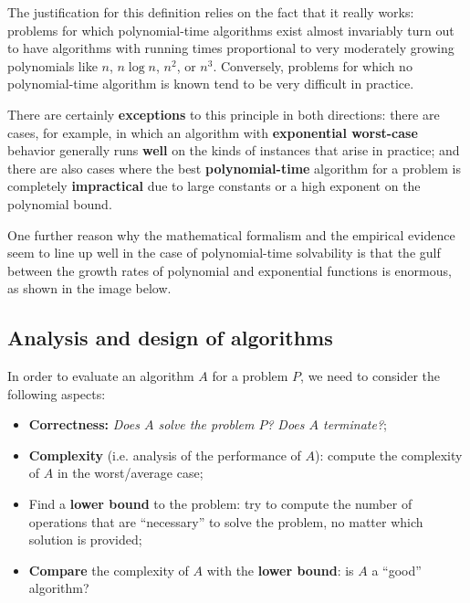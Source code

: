 The justification for this definition relies on the fact that it really works: problems for which polynomial-time algorithms exist almost invariably turn out to have algorithms with running times proportional to very moderately growing polynomials like $n$, $n \log n$, $n^2$, or $n^3$. Conversely, problems for which no polynomial-time algorithm is known tend to be very difficult in practice. 

There are certainly \textbf{exceptions} to this principle in both directions: there are cases, for example, in which an algorithm with \textbf{exponential worst-case} behavior generally runs \textbf{well} on the kinds of instances that arise in practice; and there are also cases where the best \textbf{polynomial-time} algorithm for a problem is completely \textbf{impractical} due to large constants or a high exponent on the polynomial bound. 

One further reason why the mathematical formalism and the empirical evidence seem to line up well in the case of polynomial-time solvability is that the gulf between the growth rates of polynomial and exponential functions is enormous, as shown in the image below.


\subsection{Analysis and design of algorithms}
In order to evaluate an algorithm $A$ for a problem $P$, we need to consider the following aspects:

\begin{itemize}
    \item \textbf{Correctness:} \textit{Does $A$ solve the problem $P$?} \textit{Does $A$ terminate?};
    \item \textbf{Complexity} (i.e. analysis of the performance of $A$): compute the complexity of $A$ in the worst/average case;
    \item Find a \textbf{lower bound} to the problem: try to compute the number of operations that are “necessary” to solve the problem, no matter which solution is provided;
    \item \textbf{Compare} the complexity of $A$ with the \textbf{lower bound}: is $A$ a “good” algorithm?
\end{itemize}

